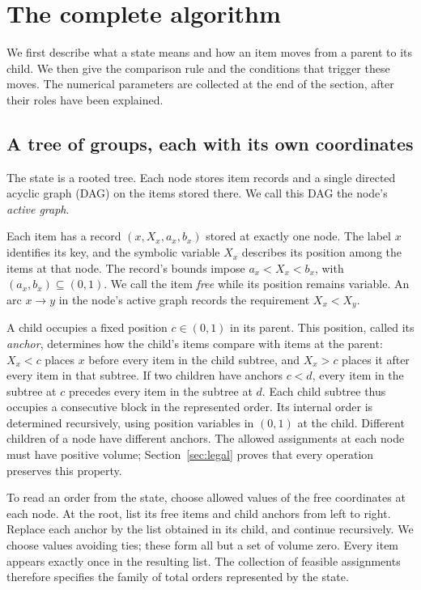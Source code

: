 \section{The complete algorithm}\label{sec:algorithm}

We first describe what a state means and how an item moves from a parent to
its child. We then give the comparison rule and the conditions that trigger
these moves. The numerical parameters are collected at the end of the
section, after their roles have been explained.

\subsection{A tree of groups, each with its own coordinates}

The state is a rooted tree. Each node stores item records and a single
directed acyclic graph (DAG) on the items stored there. We call this DAG
the node's \emph{active graph}.

Each item has a record $(x,X_x,a_x,b_x)$ stored at exactly one node.
The label $x$ identifies its key, and the symbolic variable
$X_x$ describes its position among the items at that node. The record's
bounds impose $a_x<X_x<b_x$, with $(a_x,b_x)\subseteq(0,1)$. We call the
item \emph{free} while its position remains variable. An arc $x\to y$
in the node's active graph records the requirement $X_x<X_y$.

A child occupies a fixed position $c\in(0,1)$ in its parent. This position,
called its \emph{anchor}, determines how the child's items compare with
items at the parent: $X_x<c$ places $x$ before every item in the child
subtree, and $X_x>c$ places it after every item in that subtree. If two
children have anchors $c<d$, every item in the subtree at $c$ precedes
every item in the subtree at $d$. Each child subtree thus occupies a
consecutive block in the represented order. Its internal order is
determined recursively, using position variables in $(0,1)$ at the child.
Different children of a node have different anchors.
The allowed assignments at each node must have positive volume;
Section~\ref{sec:legal} proves that every operation preserves this property.

To read an order from the state, choose allowed values of the free
coordinates at each node. At the root, list its free items and child anchors
from left to right. Replace each anchor by the list obtained in its child,
and continue recursively. We choose values avoiding ties; these form all
but a set of volume zero. Every item appears exactly once in the resulting
list. The collection of feasible assignments therefore specifies the
family of total orders represented by the state.

